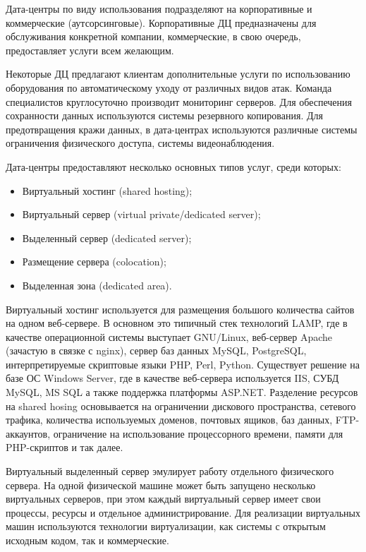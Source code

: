 Дата-центры по виду использования подразделяют на корпоративные и коммерческие (аутсорсинговые).
Корпоративные ДЦ предназначены для обслуживания конкретной компании, коммерческие, в свою очередь, предоставляет услуги всем желающим.

Некоторые ДЦ предлагают клиентам дополнительные услуги по использованию оборудования по автоматическому уходу от различных видов атак.
Команда специалистов круглосуточно производит мониторинг серверов.
Для обеспечения сохранности данных используются системы резервного копирования.
Для предотвращения кражи данных, в дата-центрах используются различные системы ограничения физического доступа, системы видеонаблюдения.

Дата-центры предоставляют несколько основных типов услуг, среди которых:
\begin{itemize}
  \item Виртуальный хостинг (shared hosting);
  \item Виртуальный сервер (virtual private/dedicated server);
  \item Выделенный сервер (dedicated server);
  \item Размещение сервера (colocation);
  \item Выделенная зона (dedicated area).
\end{itemize}

Виртуальный хостинг используется для размещения большого количества сайтов на одном веб-сервере.
В основном это типичный стек технологий LAMP, где в качестве операционной системы выступает GNU/Linux, веб-сервер Apache (зачастую в связке с nginx), сервер баз данных MySQL, PostgreSQL, интерпретируемые скриптовые языки PHP, Perl, Python.
Существует решение на базе ОС Windows Server, где в качестве веб-сервера используется IIS, СУБД MySQL, MS SQL а также поддержка платформы ASP.NET.
Разделение ресурсов на shared hosing основывается на ограничении дискового пространства, сетевого трафика, количества используемых доменов, почтовых ящиков, баз данных, FTP-аккаунтов, ограничение на использование процессорного времени, памяти для PHP-скриптов и так далее.

Виртуальный выделенный сервер эмулирует работу отдельного физического сервера.
На одной физической машине может быть запущено несколько виртуальных серверов, при этом каждый виртуальный сервер имеет свои процессы, ресурсы и отдельное администрирование.
Для реализации виртуальных машин используются технологии виртуализации, как системы с открытым исходным кодом, так и коммерческие.

